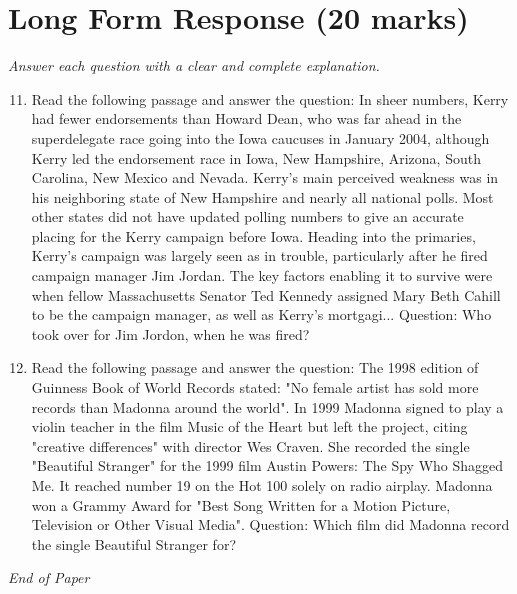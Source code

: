 \documentclass[12pt]{article}
\begin{document}
\section*{Long Form Response (20 marks)}
\textit{Answer each question with a clear and complete explanation.}
\begin{enumerate}[label=\arabic*.]
\setcounter{enumi}{10}
\item Read the following passage and answer the question: In sheer numbers, Kerry had fewer endorsements than Howard Dean, who was far ahead in the superdelegate race going into the Iowa caucuses in January 2004, although Kerry led the endorsement race in Iowa, New Hampshire, Arizona, South Carolina, New Mexico and Nevada. Kerry's main perceived weakness was in his neighboring state of New Hampshire and nearly all national polls. Most other states did not have updated polling numbers to give an accurate placing for the Kerry campaign before Iowa. Heading into the primaries, Kerry's campaign was largely seen as in trouble, particularly after he fired campaign manager Jim Jordan. The key factors enabling it to survive were when fellow Massachusetts Senator Ted Kennedy assigned Mary Beth Cahill to be the campaign manager, as well as Kerry's mortgagi... Question: Who took over for Jim Jordon, when he was fired?
\item Read the following passage and answer the question: The 1998 edition of Guinness Book of World Records stated: "No female artist has sold more records than Madonna around the world". In 1999 Madonna signed to play a violin teacher in the film Music of the Heart but left the project, citing "creative differences" with director Wes Craven. She recorded the single "Beautiful Stranger" for the 1999 film Austin Powers: The Spy Who Shagged Me. It reached number 19 on the Hot 100 solely on radio airplay. Madonna won a Grammy Award for "Best Song Written for a Motion Picture, Television or Other Visual Media". Question: Which film did Madonna record the single Beautiful Stranger for?
\end{enumerate}

\vfill
\noindent\textit{End of Paper}
\end{document}
